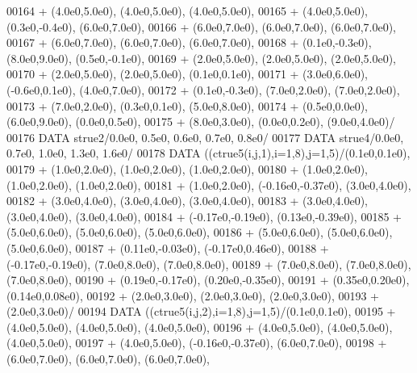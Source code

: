 \begin{DoxyCode}
00164      +                  (4.0e0,5.0e0), (4.0e0,5.0e0), (4.0e0,5.0e0),
00165      +                  (4.0e0,5.0e0), (0.3e0,-0.4e0), (6.0e0,7.0e0),
00166      +                  (6.0e0,7.0e0), (6.0e0,7.0e0), (6.0e0,7.0e0),
00167      +                  (6.0e0,7.0e0), (6.0e0,7.0e0), (6.0e0,7.0e0),
00168      +                  (0.1e0,-0.3e0), (8.0e0,9.0e0), (0.5e0,-0.1e0),
00169      +                  (2.0e0,5.0e0), (2.0e0,5.0e0), (2.0e0,5.0e0),
00170      +                  (2.0e0,5.0e0), (2.0e0,5.0e0), (0.1e0,0.1e0),
00171      +                  (3.0e0,6.0e0), (-0.6e0,0.1e0), (4.0e0,7.0e0),
00172      +                  (0.1e0,-0.3e0), (7.0e0,2.0e0), (7.0e0,2.0e0),
00173      +                  (7.0e0,2.0e0), (0.3e0,0.1e0), (5.0e0,8.0e0),
00174      +                  (0.5e0,0.0e0), (6.0e0,9.0e0), (0.0e0,0.5e0),
00175      +                  (8.0e0,3.0e0), (0.0e0,0.2e0), (9.0e0,4.0e0)/
00176       \textcolor{keyword}{DATA}              strue2/0.0e0, 0.5e0, 0.6e0, 0.7e0, 0.8e0/
00177       \textcolor{keyword}{DATA}              strue4/0.0e0, 0.7e0, 1.0e0, 1.3e0, 1.6e0/
00178       \textcolor{keyword}{DATA}              ((ctrue5(i,j,1),i=1,8),j=1,5)/(0.1e0,0.1e0),
00179      +                  (1.0e0,2.0e0), (1.0e0,2.0e0), (1.0e0,2.0e0),
00180      +                  (1.0e0,2.0e0), (1.0e0,2.0e0), (1.0e0,2.0e0),
00181      +                  (1.0e0,2.0e0), (-0.16e0,-0.37e0), (3.0e0,4.0e0),
00182      +                  (3.0e0,4.0e0), (3.0e0,4.0e0), (3.0e0,4.0e0),
00183      +                  (3.0e0,4.0e0), (3.0e0,4.0e0), (3.0e0,4.0e0),
00184      +                  (-0.17e0,-0.19e0), (0.13e0,-0.39e0),
00185      +                  (5.0e0,6.0e0), (5.0e0,6.0e0), (5.0e0,6.0e0),
00186      +                  (5.0e0,6.0e0), (5.0e0,6.0e0), (5.0e0,6.0e0),
00187      +                  (0.11e0,-0.03e0), (-0.17e0,0.46e0),
00188      +                  (-0.17e0,-0.19e0), (7.0e0,8.0e0), (7.0e0,8.0e0),
00189      +                  (7.0e0,8.0e0), (7.0e0,8.0e0), (7.0e0,8.0e0),
00190      +                  (0.19e0,-0.17e0), (0.20e0,-0.35e0),
00191      +                  (0.35e0,0.20e0), (0.14e0,0.08e0),
00192      +                  (2.0e0,3.0e0), (2.0e0,3.0e0), (2.0e0,3.0e0),
00193      +                  (2.0e0,3.0e0)/
00194       \textcolor{keyword}{DATA}              ((ctrue5(i,j,2),i=1,8),j=1,5)/(0.1e0,0.1e0),
00195      +                  (4.0e0,5.0e0), (4.0e0,5.0e0), (4.0e0,5.0e0),
00196      +                  (4.0e0,5.0e0), (4.0e0,5.0e0), (4.0e0,5.0e0),
00197      +                  (4.0e0,5.0e0), (-0.16e0,-0.37e0), (6.0e0,7.0e0),
00198      +                  (6.0e0,7.0e0), (6.0e0,7.0e0), (6.0e0,7.0e0),

\end{DoxyCode}
